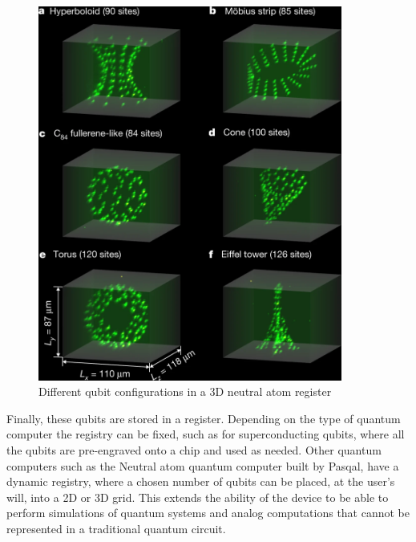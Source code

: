 \begin{figure}
  \centering
  \includegraphics[width=100mm]{./Images/register3D.png}
  \caption{Different qubit configurations in a 3D neutral atom register \cite{barredoSyntheticThreedimensionalAtomic2018}} 
  \label{fig:3d register}

\end{figure}
Finally, these qubits are stored in a register. Depending on the type of quantum computer the registry can be fixed, such as for superconducting qubits, where all the qubits 
are pre-engraved onto a chip and used as needed\cite{laddQuantumComputers2010}. Other quantum computers such as the Neutral atom quantum computer built by Pasqal, have a dynamic registry, where a chosen
number of qubits can be placed, at the user's will, into a 2D or 3D grid. This extends the ability of the device to be able to perform simulations of quantum systems and analog
computations that cannot be represented in a traditional quantum circuit.
\\ \\ \\ \\ \\ \\ \\ \\ \\

